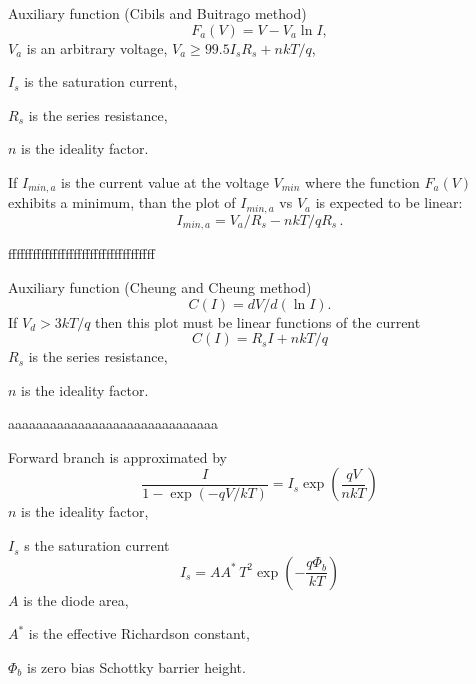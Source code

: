 \documentclass[14pt]{article}
\numberwithin{equation}{part}
\begin{document}
\fontsize{14}{16pt}\selectfont

\noindent
Auxiliary  function (Cibils  and  Buitrago method)
\begin{equation*}
F_a(V)=V-V_a\ln I,
\end{equation*}
$V_a$ is an arbitrary voltage, $V_a\geq99.5I_sR_s+nkT/q$,

\noindent
$I_s$ is the saturation current,

\noindent
$R_s$ is the series resistance,

\noindent
$n$ is the ideality factor.

If $I_{min,a}$ is the current value at the voltage $V_{min}$ where the function $F_a(V)$ exhibits a minimum, than
the plot of $I_{min,a}$ vs $V_a$ is expected to be linear:
\begin{equation*}
I_{min,a}=V_a/R_s-nkT/qR_s\,.
\end{equation*}

ffffffffffffffffffffffffffffffffffff
\vspace{5mm}

Auxiliary  function (Cheung and Cheung method)
\begin{equation*}
C(I)=dV/d(\ln I).
\end{equation*}
If $V_d>3kT/q$ then this plot must be linear  functions of the  current
\begin{equation*}
C(I)=R_sI+nkT/q
\end{equation*}
$R_s$ is the series resistance,

\noindent
$n$ is the ideality factor.

\vspace{5mm}
aaaaaaaaaaaaaaaaaaaaaaaaaaaaaa
\vspace{5mm}

Forward branch is approximated by
\begin{equation*}
\frac{I}{1-\exp(-qV/kT)}=I_s\exp\left(\frac{qV}{nkT}\right)
\end{equation*}
\noindent
$n$ is the ideality factor,

\noindent
$I_s$ s the saturation current
\begin{equation*}
I_s=AA^*\,T^2\exp\left(-\frac{q\Phi_b}{kT}\right)
\end{equation*}
$A$ is the diode area,

\noindent
$A^*$ is the effective Richardson constant,

\noindent
$\Phi_b$ is zero bias Schottky barrier height.
\end{document}
